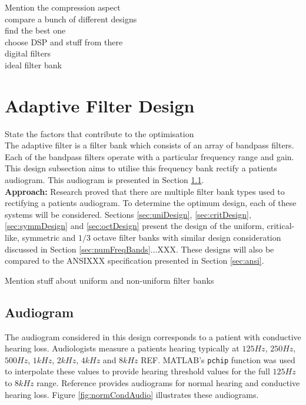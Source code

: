 \documentclass[12pt, onecolumn]{article}
\begin{document}
Mention the compression aspect\\
compare a bunch of different designs\\
find the best one\\
choose DSP and stuff from there\\
digital filters\\
ideal filter bank

\section{Adaptive Filter Design}

State the factors that contribute to the optimisation\\
\noindent The adaptive filter is a filter bank which consists of an array of bandpass filters. Each of the bandpass filters operate with a particular frequency range and gain. This design subsection aims to utilise this frequency bank rectify a patients audiogram. This audiogram is presented in Section \ref{sec:audiogram}.\\

\noindent \textbf{Approach:} Research proved that there are multiple filter bank types used to rectifying a patients audiogram. To determine the optimum design, each of these systems will be considered. Sections \ref{sec:uniDesign}, \ref{sec:critDesign}, \ref{sec:symmDesign} and \ref{sec:octDesign} present the design of the uniform, critical-like, symmetric and $1/3$ octave filter banks with similar design consideration discussed in Section \ref{sec:numFreqBands}...XXX. These designs will also be compared to the ANSIXXX specification presented in Section \ref{sec:ansi}.

Mention stuff about uniform and non-uniform filter banks

\subsection{Audiogram}
\label{sec:audiogram}

\noindent The audiogram considered in this design corresponds to a patient with conductive hearing loss. Audiologists measure a patients hearing typically at $125Hz$, $250Hz$, $500Hz$, $1kHz$, $2kHz$, $4kHz$ and $8kHz$ REF. MATLAB's \texttt{pchip} function was used to interpolate these values to provide hearing threshold values for the full $125Hz$ to $8kHz$ range. Reference \cite{mahmoud} provides audiograms for normal hearing and conductive hearing loss. Figure \ref{fig:normCondAudio} illustrates these audiograms.
\end{document}
